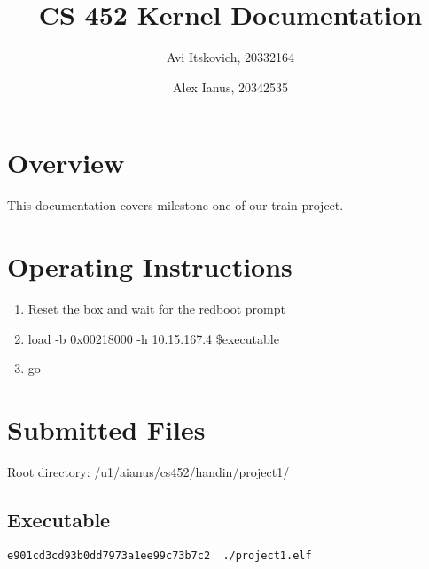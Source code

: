 \documentclass{article}
\title{CS 452 Kernel Documentation}
\author{
  Avi Itskovich, 20332164
  \and
  Alex Ianus, 20342535
}
\begin{document}
\maketitle

\section{Overview}

This documentation covers milestone one of our train project.

\section{Operating Instructions}
\begin{enumerate}
  \item Reset the box and wait for the redboot prompt
  \item load -b 0x00218000 -h 10.15.167.4 \$executable
  \item go
\end{enumerate}

\section{Submitted Files}
Root directory: /u1/aianus/cs452/handin/project1/

\subsection{Executable}
\begin{verbatim}
e901cd3cd93b0dd7973a1ee99c73b7c2  ./project1.elf
\end{verbatim}
\end{document}
